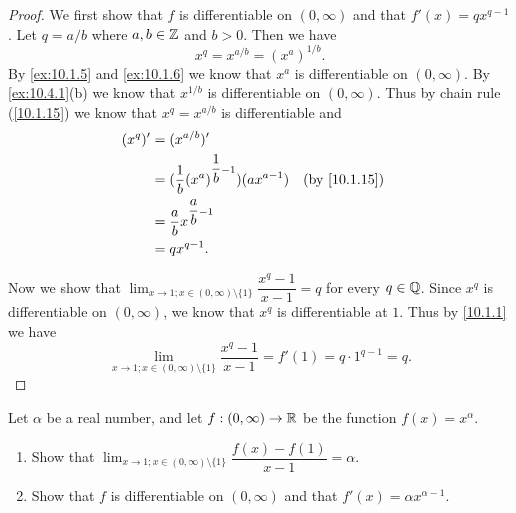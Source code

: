 \begin{proof}
  We first show that \(f\) is differentiable on \((0, \infty)\) and that \(f'(x) = q x^{q - 1}\).
  Let \(q = a / b\) where \(a, b \in \mathbb{Z}\) and \(b > 0\).
  Then we have
  \[
    x^q = x^{a / b} = (x^a)^{1 / b}.
  \]
  By \cref{ex:10.1.5} and \cref{ex:10.1.6} we know that \(x^a\) is differentiable on \((0, \infty)\).
  By \cref{ex:10.4.1}(b) we know that \(x^{1 / b}\) is differentiable on \((0, \infty)\).
  Thus by chain rule (\cref{10.1.15}) we know that \(x^q = x^{a / b}\) is differentiable and
  \begin{align*}
    (x^q)' & = (x^{a / b})'                                                                          \\
           & = (\dfrac{1}{b} (x^a)^{\dfrac{1}{b} - 1}) (a x^{a - 1}) &  & \text{(by \cref{10.1.15})} \\
           & = \dfrac{a}{b} x^{\dfrac{a}{b} - 1}                                                     \\
           & = q x^{q - 1}.
  \end{align*}

  Now we show that \(\lim_{x \to 1 ; x \in (0, \infty) \setminus \{1\}} \dfrac{x^q - 1}{x - 1} = q\) for every \(q \in \mathbb{Q}\).
  Since \(x^q\) is differentiable on \((0, \infty)\), we know that \(x^q\) is differentiable at \(1\).
  Thus by \cref{10.1.1} we have
  \[
    \lim_{x \to 1 ; x \in (0, \infty) \setminus \{1\}} \dfrac{x^q - 1}{x - 1} = f'(1) = q \cdot 1^{q - 1} = q.
  \]
\end{proof}

\begin{ex}\label{ex:10.4.3}
  Let \(\alpha\) be a real number, and let \(f : (0, \infty) \to \mathbb{R}\) be the function \(f(x) = x^{\alpha}\).
  \begin{enumerate}
    \item Show that \(\lim_{x \to 1 ; x \in (0, \infty) \setminus \{1\}} \dfrac{f(x) - f(1)}{x - 1} = \alpha\).
    \item Show that \(f\) is differentiable on \((0, \infty)\) and that \(f'(x) = \alpha x^{\alpha - 1}\).
  \end{enumerate}
\end{ex}

